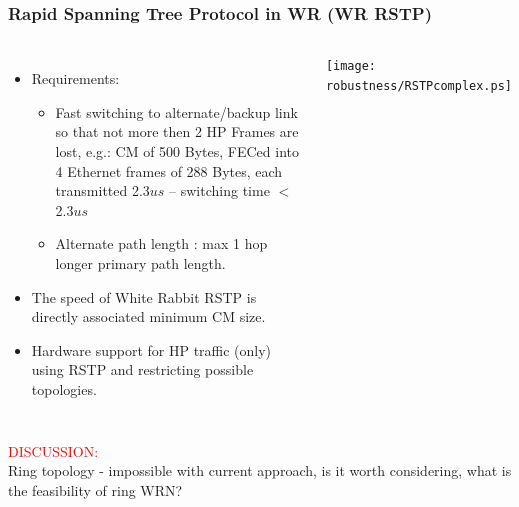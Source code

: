 \documentclass[]{beamer}
\begin{document}
\begin{frame}
  \frametitle{Rapid Spanning Tree Protocol in WR (WR RSTP)}
  
  \begin{columns}[c]
  \column{3.8in} 

  \begin{itemize}
  \item Requirements:
  \begin{itemize}
    \item Fast switching to alternate/backup link so that not more then 2 HP
          Frames are lost, e.g.: CM of 500 Bytes, FECed into 4 Ethernet frames
          of 288 Bytes, each transmitted 2.3$us$ -- switching time $<$ 2.3$us$
    \item Alternate path length : max 1 hop longer primary path length.
  \end{itemize}
  \item The speed of White Rabbit RSTP is directly associated minimum CM size.
  \item Hardware support for HP traffic (only) using RSTP and restricting
        possible topologies.
  \end{itemize}

  \column{1.2in}

  \centering
  \texttt{[image: robustness/RSTPcomplex.ps]}

  \end{columns}
\centering
\textcolor{red}{DISCUSSION:} \\
Ring topology - impossible with current approach, is it worth considering, what
is the feasibility of ring WRN?

\end{frame}
\end{document}
